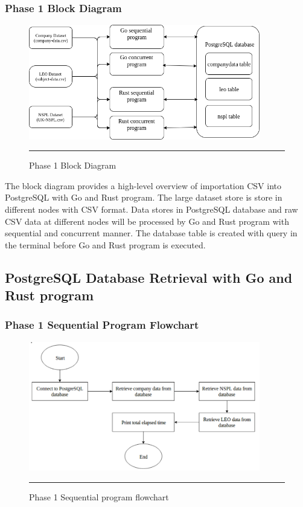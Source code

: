 \subsubsection{Phase 1 Block Diagram}

\begin{figure}[H]
	\centering
	\includegraphics[width=0.9\textwidth]{Figure/block-diagram.png}
	\rule{35em}{0.5pt}
	\caption[Phase 1 Block Diagram]{Phase 1 Block Diagram}
\end{figure}

The block diagram provides a high-level overview of importation CSV into PostgreSQL with Go and Rust program. The large dataset store is store in different nodes with CSV format. Data stores in PostgreSQL database and raw CSV data at different nodes will be processed by Go and Rust program with sequential and concurrent manner. The database table is created with query in the terminal before Go and Rust program is executed.

\subsection{PostgreSQL Database Retrieval with Go and Rust program}

\subsubsection{Phase 1 Sequential Program Flowchart}

\begin{figure}[H]
	\centering
	\includegraphics[width=0.9\textwidth]{Figure/postgres-data-sequential.png}
	\rule{35em}{0.5pt}
	\caption[Phase 1 Sequential program flowchart]{Phase 1 Sequential program flowchart}
\end{figure}

